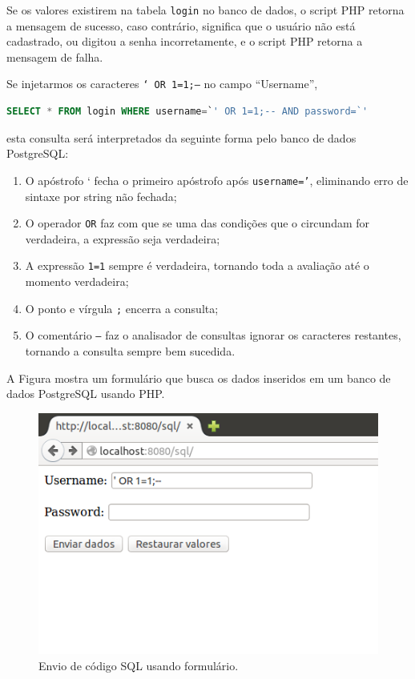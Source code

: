 \begin{frame}{}

  Se os valores existirem na tabela {\tt login} no banco de dados, o
script PHP retorna a mensagem de sucesso, caso contrário, significa
que o usuário não está cadastrado, ou digitou a senha incorretamente,
e o script PHP retorna a mensagem de falha.
\end{frame}

\begin{frame}[fragile]{}

Se injetarmos os caracteres {\tt ` OR 1=1;--} no campo ``Username'',

\begin{lstlisting}[language=SQL]
SELECT * FROM login WHERE username=`' OR 1=1;-- AND password=`'
\end{lstlisting}

esta consulta será interpretados da seguinte forma pelo banco de dados
PostgreSQL:

\begin{enumerate}
\item O apóstrofo ` fecha o primeiro apóstrofo após {\tt username='},
  eliminando erro de sintaxe por string não fechada;
\item O operador {\tt OR} faz com que se uma das condições que o
  circundam for verdadeira, a expressão seja verdadeira;\pause
\item A expressão {\tt 1=1} sempre é verdadeira, tornando toda a
  avaliação até o momento verdadeira;
\item O ponto e vírgula {\tt ;} encerra a consulta;\pause
\item O comentário {\tt --} faz o analisador de consultas ignorar os
  caracteres restantes, tornando a consulta sempre bem sucedida.
\end{enumerate}
\end{frame}

\begin{frame}{}\small
A Figura mostra um formulário que busca os dados inseridos 
em um banco de dados PostgreSQL usando PHP.

  \begin{figure}
    \centering
    \includegraphics[scale=.5]{img/sql-snd.png}
    \caption{Envio de código SQL usando formulário.}
  \end{figure}
\end{frame}

